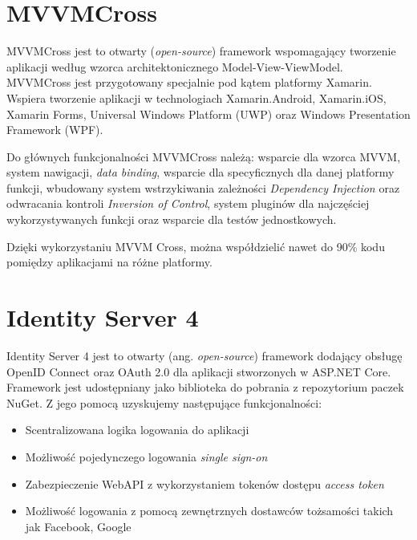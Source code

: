 \section{MVVMCross}
\label{sec:mvvmCross}
MVVMCross jest to otwarty (\textit{open-source}) framework wspomagający tworzenie aplikacji według wzorca architektonicznego Model-View-ViewModel. MVVMCross jest przygotowany specjalnie pod kątem platformy Xamarin. Wspiera tworzenie aplikacji w technologiach Xamarin.Android, Xamarin.iOS, Xamarin Forms, Universal Windows Platform (UWP) oraz Windows Presentation Framework (WPF).

Do głównych funkcjonalności MVVMCross należą: wsparcie dla wzorca MVVM, system nawigacji, \textit{data binding}, wsparcie dla specyficznych dla danej platformy funkcji, wbudowany system wstrzykiwania zależności \textit{Dependency Injection} oraz odwracania kontroli \textit{Inversion of Control}, system pluginów dla najczęściej wykorzystywanych funkcji oraz wsparcie dla testów jednostkowych. \cite{GettingS94:online}

Dzięki wykorzystaniu MVVM Cross, można współdzielić nawet do 90\% kodu pomiędzy aplikacjami na różne platformy.
\newpage
\section{Identity Server 4}
\label{sec:is4}
Identity Server 4 jest to otwarty (ang. \textit{open-source}) framework dodający obsługę OpenID Connect oraz OAuth 2.0 dla aplikacji stworzonych w ASP.NET Core. Framework jest udostępniany jako biblioteka do pobrania z repozytorium paczek NuGet. Z jego pomocą uzyskujemy następujące funkcjonalności:
\begin{itemize}
\item {Scentralizowana logika logowania do aplikacji}
\item {Możliwość pojedynczego logowania \textit{single sign-on}}
\item {Zabezpieczenie WebAPI z wykorzystaniem tokenów dostępu \textit{access token}}
\item {Możliwość logowania z pomocą zewnętrznych dostawców tożsamości takich jak Facebook, Google}
\end{itemize}
